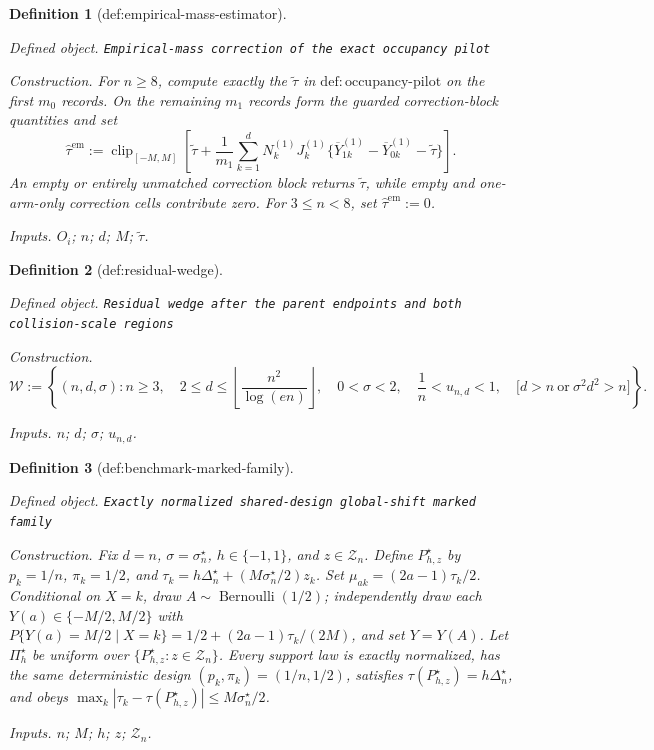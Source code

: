 \documentclass{article}
\newtheorem{definition}{Definition}
\begin{document}
\begin{definition}[def:empirical-mass-estimator]\label{def:empirical-mass-estimator}
\par\smallskip\noindent\emph{Defined object.} \texttt{Empirical-\allowbreak{}mass correction of the exact occupancy pilot}
\par\smallskip\noindent\emph{Construction.} For \(n\ge8\), compute exactly the \(\widetilde\tau\) in \(\mathrm{def:occupancy\text{-}pilot}\) on the first \(m_0\) records. On the remaining \(m_1\) records form the guarded correction-block quantities and set \[\widehat\tau^{\mathrm{em}}:=\operatorname{clip}_{[-M,M]}\!\left[\widetilde\tau+\frac1{m_1}\sum_{k=1}^dN_k^{(1)}J_k^{(1)}\{\overline Y_{1k}^{(1)}-\overline Y_{0k}^{(1)}-\widetilde\tau\}\right].\] An empty or entirely unmatched correction block returns \(\widetilde\tau\), while empty and one-arm-only correction cells contribute zero. For \(3\le n<8\), set \(\widehat\tau^{\mathrm{em}}:=0\).
\par\smallskip\noindent\emph{Inputs.} \(O_i\); \(n\); \(d\); \(M\); \(\widetilde\tau\).
\end{definition}

\begin{definition}[def:residual-wedge]\label{def:residual-wedge}
\par\smallskip\noindent\emph{Defined object.} \texttt{Residual wedge after the parent endpoints and both collision-\allowbreak{}scale regions}
\par\smallskip\noindent\emph{Construction.} \[
 \mathcal W:=\left\{(n,d,\sigma):
 n\ge3,\quad
 2\le d\le\left\lfloor\frac{n^2}{\log(en)}\right\rfloor,\quad
 0<\sigma<2,\quad
 \frac1n<u_{n,d}<1,\quad
 \bigl[d>n\ \text{or}\ \sigma^2d^2>n\bigr]
 \right\}.
\]
\par\smallskip\noindent\emph{Inputs.} \(n\); \(d\); \(\sigma\); \(u_{n,d}\).
\end{definition}

\begin{definition}[def:benchmark-marked-family]\label{def:benchmark-marked-family}
\par\smallskip\noindent\emph{Defined object.} \texttt{Exactly normalized shared-\allowbreak{}design global-\allowbreak{}shift marked family}
\par\smallskip\noindent\emph{Construction.} Fix \(d=n\), \(\sigma=\sigma_n^\star\), \(h\in\{-1,1\}\), and \(z\in\mathcal Z_n\). Define \(P_{h,z}^\star\) by \(p_k=1/n\), \(\pi_k=1/2\), and \(\tau_k=h\Delta_n^\star+(M\sigma_n^\star/2)z_k\). Set \(\mu_{ak}=(2a-1)\tau_k/2\). Conditional on \(X=k\), draw \(A\sim\operatorname{Bernoulli}(1/2)\); independently draw each \(Y(a)\in\{-M/2,M/2\}\) with \(P\{Y(a)=M/2\mid X=k\}=1/2+(2a-1)\tau_k/(2M)\), and set \(Y=Y(A)\). Let \(\Pi_h^\star\) be uniform over \(\{P_{h,z}^\star:z\in\mathcal Z_n\}\). Every support law is exactly normalized, has the same deterministic design \((p_k,\pi_k)=(1/n,1/2)\), satisfies \(\tau(P_{h,z}^\star)=h\Delta_n^\star\), and obeys \(\max_k|\tau_k-\tau(P_{h,z}^\star)|\le M\sigma_n^\star/2\).
\par\smallskip\noindent\emph{Inputs.} \(n\); \(M\); \(h\); \(z\); \(\mathcal Z_n\).
\end{definition}
\end{document}
